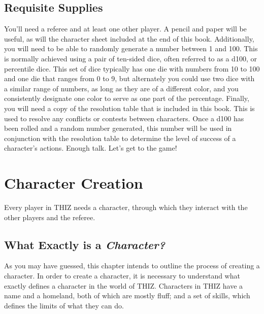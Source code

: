 \documentclass[oneside]{book}
\begin{document}
\section*{Requisite Supplies}

You'll need a referee and at least one other player. A pencil and paper will be useful, as will the character sheet included at the end of this book. Additionally, you will need to be able to randomly generate a number between 1 and 100. This is normally achieved using a pair of ten-sided dice, often referred to as a d100, or percentile dice.  This set of dice typically has one die with numbers from 10 to 100 and one die that ranges from 0 to 9, but alternately you could use two dice with a similar range of numbers, as long as they are of a different color, and you consistently designate one color to serve as one part of the percentage. Finally, you will need a copy of the resolution table that is included in this book. This is used to resolve any conflicts or contests between characters. Once a d100 has been rolled and a random number generated, this number will be used in conjunction with the resolution table to determine the level of success of a character's actions. Enough talk. Let's get to the game!

\mainmatter
{}

\chapter{Character Creation}
Every player in THIZ needs a character, through which they interact with the other players and the referee.

\section{What Exactly is a \emph{Character?}}
As you may have guessed, this chapter intends to outline the process of creating a character. In order to create a character, it is necessary to understand what exactly defines a character in the world of THIZ. Characters in THIZ have a name and a homeland, both of which are mostly fluff; and a set of skills, which defines the limits of what they can do.
\end{document}
